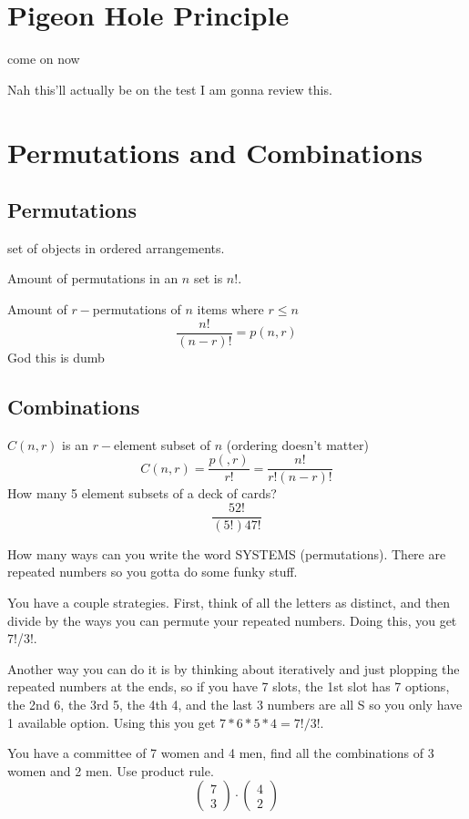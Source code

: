 \documentclass{report}
\begin{document}
\chapter{Pigeon Hole Principle}
come on now

Nah this'll actually be on the test I am gonna review this.


\chapter{Permutations and Combinations}
\section{Permutations}
set of objects in ordered arrangements.

Amount of permutations in an $n$ set is $n!$.

Amount of $r-$permutations of $n$ items where $r \leq n$
\[
\frac{n!}{(n-r)!} = p(n, r)
\]
God this is dumb

\newpage
\section{Combinations}
$C(n, r)$ is an $r-$element subset of $n$ (ordering doesn't matter)
\[
C(n, r) = \frac{p(, r)}{r!} = \frac{n!}{r!(n-r)!}
\]
How many 5 element subsets of a deck of cards?
\[
\frac{52!}{(5!)47!}
\]
\newline

How many ways can you write the word SYSTEMS (permutations). There are repeated numbers so you gotta do some funky stuff.

You have a couple strategies. First, think of all the letters as distinct, and then divide by the ways you can permute your repeated numbers. Doing this, you get 7!/3!.

Another way you can do it is by thinking about iteratively and just plopping the repeated numbers at the ends, so if you have 7 slots, the 1st slot has 7 options, the 2nd 6, the 3rd 5, the 4th 4, and the last 3 numbers are all S so you only have 1 available option. Using this you get $7*6*5*4 = 7!/3!$.

\newpage
You have a committee of 7 women and 4 men, find all the combinations of 3 women and 2 men. Use product rule.
\[
\begin{pmatrix}7 \\ 3 \end{pmatrix}
\cdot
\begin{pmatrix}4 \\ 2 \end{pmatrix}
\]
\end{document}
